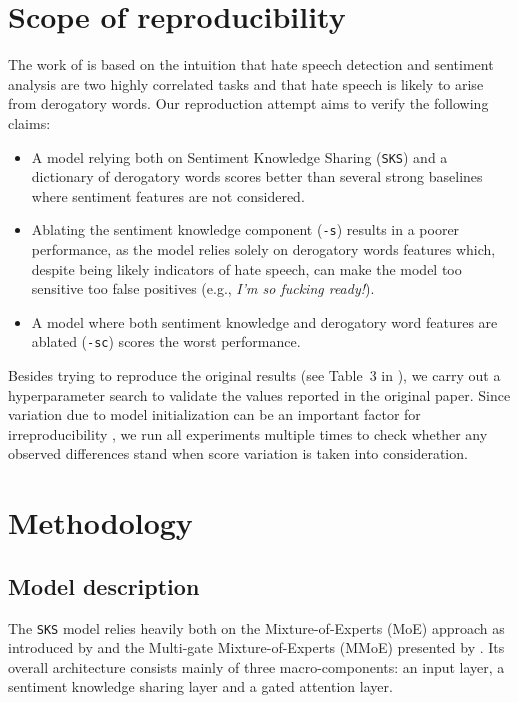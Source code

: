 \section{Scope of reproducibility}
\label{sec:claims}

The work of \citeauthor{original:zhou} \cite{original:zhou} is based on the intuition that hate speech detection and sentiment analysis are two highly correlated tasks and that hate speech is likely to arise from derogatory words. Our reproduction attempt aims to verify the following claims:

\begin{itemize}
    \item A model relying both on Sentiment Knowledge Sharing (\texttt{SKS}) and a dictionary of derogatory words scores better than several strong baselines where sentiment features are not considered.
    \item Ablating the sentiment knowledge component (\texttt{-s}) results in a poorer performance, as the model relies solely on derogatory words features which, despite being likely indicators of hate speech, can make the model too sensitive too false positives (e.g., \textit{I’m so fucking ready!}).
    \item A model where both sentiment knowledge and derogatory word features are ablated (\texttt{-sc}) scores the worst performance.
\end{itemize}

Besides trying to reproduce the original results (see Table~3 in \cite{original:zhou}), we carry out a hyperparameter search to validate the values reported in the original paper.
Since variation due to model initialization can be an important factor
for irreproducibility \cite{reimers2017,coltekin2020,gundersen2022},
we run all experiments multiple times
to check whether any observed differences stand when score variation is taken into consideration.


\section{Methodology}

\subsection{Model description}\label{sec:model-description}
    The \texttt{SKS} model relies heavily both on the Mixture-of-Experts (MoE) approach as introduced by \citeauthor{shazeer2017} \cite{shazeer2017} and the Multi-gate Mixture-of-Experts (MMoE) presented by \citeauthor{ma2018}  \cite{ma2018}. Its overall architecture consists mainly of three macro-components: an input layer, a sentiment knowledge sharing layer and a gated attention layer.


